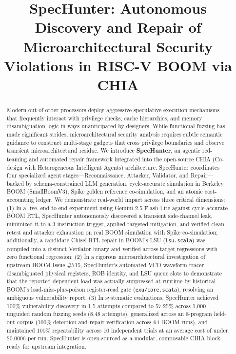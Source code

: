 \documentclass[conference,10pt]{IEEEtran}
\begin{document}
\title{SpecHunter: Autonomous Discovery and Repair of Microarchitectural Security Violations in RISC-V BOOM via CHIA}

\author{
}

\maketitle

\begin{abstract}
Modern out-of-order processors deploy aggressive speculative execution mechanisms that frequently interact with privilege checks, cache hierarchies, and memory disambiguation logic in ways unanticipated by designers. While functional fuzzing has made significant strides, microarchitectural security analysis requires subtle semantic guidance to construct multi-stage gadgets that cross privilege boundaries and observe transient microarchitectural residue. We introduce \textbf{SpecHunter}, an agentic red-teaming and automated repair framework integrated into the open-source CHIA (Co-design with Heterogeneous Intelligent Agents) architecture. SpecHunter coordinates four specialized agent stages---Reconnaissance, Attacker, Validator, and Repair---backed by schema-constrained LLM generation, cycle-accurate simulation in Berkeley BOOM (SmallBoomV3), Spike golden reference co-simulation, and an atomic cost-accounting ledger.
We demonstrate real-world impact across three critical dimensions: (1) In a live, end-to-end experiment using Gemini 2.5 Flash-Lite against cycle-accurate BOOM RTL, SpecHunter autonomously discovered a transient side-channel leak, minimized it to a 3-instruction trigger, applied targeted mitigation, and verified clean retest and attacker exhaustion on real BOOM simulation with Spike co-simulation; additionally, a candidate Chisel RTL repair in BOOM's LSU (\texttt{lsu.scala}) was compiled into a distinct Verilator binary and verified across target regressions with zero functional regression; (2) In a rigorous microarchitectural investigation of upstream BOOM Issue \#715, SpecHunter's automated VCD waveform tracer disambiguated physical registers, ROB identity, and LSU queue slots to demonstrate that the reported dependent load was actually suppressed at runtime by historical BOOM's load-miss-plus-poison register-read gate (\texttt{exu/core.scala}), resolving an ambiguous vulnerability report; (3) In systematic evaluations, SpecHunter achieved 100\% vulnerability discovery in 1.5 attempts compared to 57.25\% across 1,000 unguided random fuzzing seeds (8.48 attempts), generalized across an 8-program held-out corpus (100\% detection and repair verification across 64 BOOM runs), and maintained 100\% repeatability across 10 independent trials at an average cost of under \$0.0006 per run. SpecHunter is open-sourced as a modular, composable CHIA block ready for upstream integration.
\end{abstract}
\end{document}
